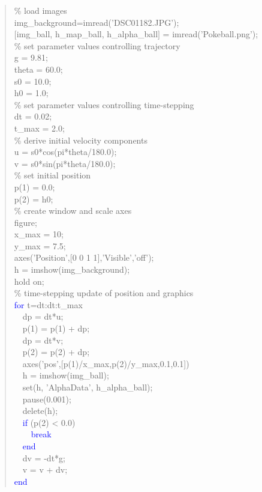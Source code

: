 \documentclass{tufte-book} %
\newenvironment{docspec}{\begin{quotation}\ttfamily\parskip0pt\parindent0pt\ignorespaces}{\end{quotation}}
\begin{document}
\begin{docspec}
\textcolor[rgb]{0,0.501961,0}{\% load images}\\
img\_background=imread(\textcolor[rgb]{1,0,1}{'DSC01182.JPG'});\\
\([\)img\_ball, h\_map\_ball, h\_alpha\_ball\(]\) = imread(\textcolor[rgb]{1,0,1}{'Pokeball.png')};\\
\textcolor[rgb]{0,0.501961,0}{\% set parameter values controlling trajectory}\\
g = 9.81;\\
theta = 60.0;\\
s0 = 10.0;\\
h0 = 1.0;\\
\textcolor[rgb]{0,0.501961,0}{\% set parameter values controlling time-stepping}\\
dt = 0.02;\\
t\_max = 2.0;\\
\textcolor[rgb]{0,0.501961,0}{\% derive initial velocity components}\\
u = s0*cos(pi*theta/180.0);\\
v = s0*sin(pi*theta/180.0);\\
\textcolor[rgb]{0,0.501961,0}{\% set initial position}\\
p(1) = 0.0;\\
p(2) = h0;\\
\textcolor[rgb]{0,0.501961,0}{\% create window and scale axes}\\
figure;\\
x\_max = 10;\\
y\_max = 7.5;\\
axes(\textcolor[rgb]{1,0,1}{'Position'},[0 0 1 1],\textcolor[rgb]{1,0,1}{'Visible'},\textcolor[rgb]{1,0,1}{'off'});\\
h = imshow(img\_background);\\
hold \textcolor[rgb]{1,0,1}{on};\\
\textcolor[rgb]{0,0.501961,0}{\% time-stepping update of position and graphics}\\
\textcolor{blue}{for} t=dt:dt:t\_max\\
\ \ dp = dt*u;\\
\ \ p(1) = p(1) + dp;\\
\ \ dp = dt*v;\\
\ \ p(2) = p(2) + dp;\\
\ \ axes(\textcolor[rgb]{1,0,1}{'pos'},[p(1)/x\_max,p(2)/y\_max,0.1,0.1])\\
\ \ h = imshow(img\_ball);\\
\ \ set(h, \textcolor[rgb]{1,0,1}{'AlphaData'}, h\_alpha\_ball);\\
\ \ pause(0.001);\\
\ \ delete(h);\\
\ \ \textcolor{blue}{if} (p(2) < 0.0)\\
\ \ \ \ \textcolor{blue}{break}\\
\ \ \textcolor{blue}{end}\\
\ \ dv = -dt*g;\\
\ \ v = v + dv;\\
\textcolor{blue}{end}
\end{docspec}
\end{document}
